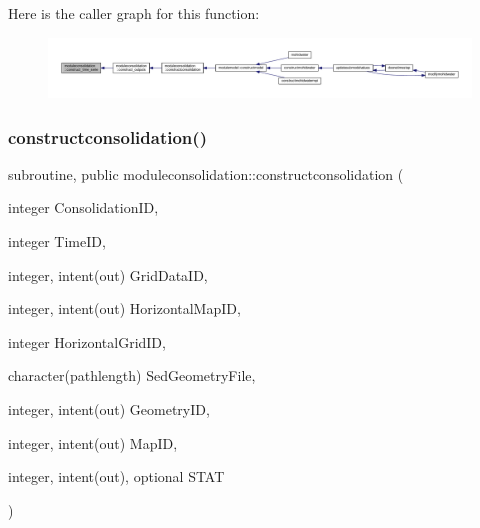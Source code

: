 Here is the caller graph for this function\+:\nopagebreak
\begin{figure}[H]
\begin{center}
\leavevmode
\includegraphics[width=350pt]{namespacemoduleconsolidation_a7138aa2bb0b64953d0ca37c18692d505_icgraph}
\end{center}
\end{figure}
\mbox{\label{namespacemoduleconsolidation_aac026f0503f905b1fdf70f85f58f7b69}} 
\subsubsection{\texorpdfstring{constructconsolidation()}{constructconsolidation()}}
{\footnotesize\ttfamily subroutine, public moduleconsolidation\+::constructconsolidation (\begin{DoxyParamCaption}\item[{integer}]{Consolidation\+ID,  }\item[{integer}]{Time\+ID,  }\item[{integer, intent(out)}]{Grid\+Data\+ID,  }\item[{integer, intent(out)}]{Horizontal\+Map\+ID,  }\item[{integer}]{Horizontal\+Grid\+ID,  }\item[{character(pathlength)}]{Sed\+Geometry\+File,  }\item[{integer, intent(out)}]{Geometry\+ID,  }\item[{integer, intent(out)}]{Map\+ID,  }\item[{integer, intent(out), optional}]{S\+T\+AT }\end{DoxyParamCaption})}

